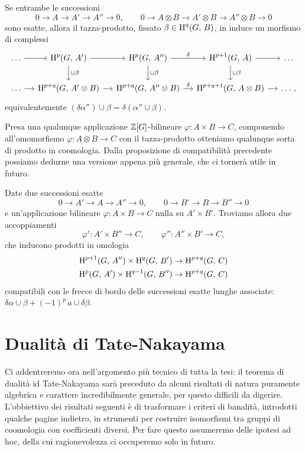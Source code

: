 \begin{proposition}\label{cup1}
	Se entrambe le successioni
	\[ 0 \to A \to A' \to A'' \to 0, \qquad 0 \to A \otimes B \to A'\otimes B \to A''\otimes B \to 0 \]
	sono esatte, allora il tazza-prodotto, fissato $ \beta \in \operatorname{H}^q(G, \, B) $, in induce un morfismo di complessi
	\[\begin{tikzcd}[column sep = small]
	\dots \rar
	& \HH^{p}(G, \, A') \dar["\cup\beta"] \rar 
	& \HH^{p}(G, \, A'') \rar["\delta"] \dar["\cup\beta"]
	& \HH^{p+1}(G, \, A) \rar \dar["\cup\beta"]
	&\dots  \\
	\dots \rar
	& \HH^{p+q}(G, \, A'\otimes B) \rar
	& \HH^{p+q}(G, \, A''\otimes B) \rar["\delta"]
	& \HH^{p+q+1}(G, \, A\otimes B) \rar &\dots \, , \end{tikzcd}\]
	equivalentemente $ (\delta\alpha'') \cup \beta = \delta (\alpha'' \cup \beta) $.
\end{proposition}

Presa una qualunque applicazione $ \mathbb{Z}[G] $-bilineare $ \varphi\colon A \times B \to C $, componendo all'omomorfismo $ \varphi\colon A \otimes B \to C  $ con il tazza-prodotto otteniamo qualunque sorta di prodotto in coomologia. Dalla proposizione di compatibilità precedente possiamo dedurne una versione appena più generale, che ci tornerà utile in futuro.

\begin{lemma}\label{cup2}
	Date due successioni esatte
	\[ 0 \to A' \to A \to A'' \to 0, \qquad 0 \to B' \to B \to B'' \to 0 \]
	e un'applicazione bilineare $  \varphi\colon A \times B \to C $ nulla su $ A'\times B' $. Troviamo allora due accoppiamenti
	\[ \varphi'\colon A' \times B'' \to C, \qquad \varphi''\colon A'' \times B' \to C, \]
	che inducono prodotti in omologia
	\begin{align*}
		\operatorname{H}^{p+1}(G, \, A'') \times \operatorname{H}^{q}(G, \, B') &\to \operatorname{H}^{p+q}(G, \, C)\\
		\operatorname{H}^{p}(G, \, A') \times \operatorname{H}^{q-1}(G, \, B'') &\to \operatorname{H}^{p+q}(G, \, C)
	\end{align*}
	compatibili con le frecce di bordo delle successioni esatte lunghe associate:  $ \delta \alpha \cup \beta + (-1)^p \, a \cup \delta \beta $.
\end{lemma}

\section{Dualità di Tate-Nakayama}
Ci addentreremo ora nell'argomento più tecnico di tutta la tesi: il teorema di dualità id Tate-Nakayama sarà preceduto da alcuni risultati di natura puramente algebrica e carattere incredibilmente generale, per questo difficili da digerire. L'obbiettivo dei risultati seguenti è di trasformare i criteri di banalità, introdotti qualche pagine indietro, in strumenti per costruire isomorfismi tra gruppi di coomologia con coefficienti diversi. Per fare questo assumeremo delle ipotesi ad hoc, della cui ragionevolezza ci occuperemo solo in futuro. 

